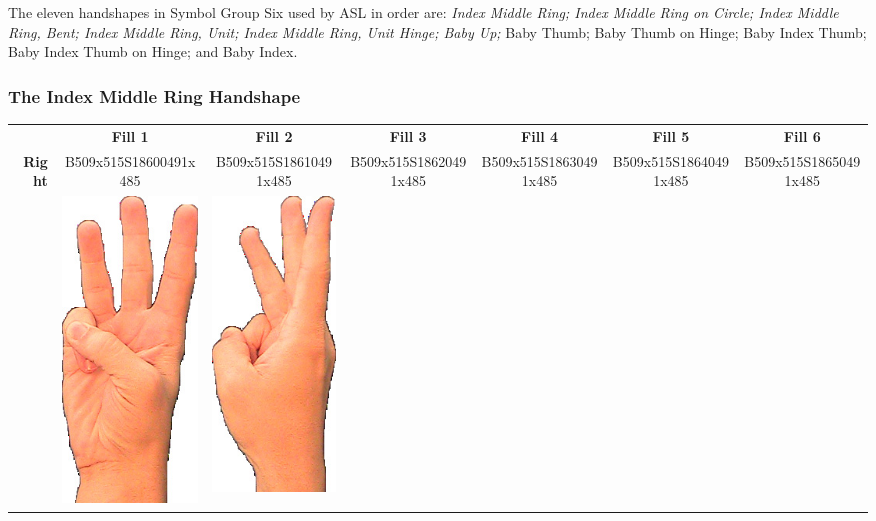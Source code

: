 \documentclass{article}
\begin{document}
The eleven handshapes in Symbol Group Six used by ASL in order are:
{\it
Index Middle Ring;
Index Middle Ring on Circle;
Index Middle Ring, Bent;
Index Middle Ring, Unit;
Index Middle Ring, Unit Hinge;
Baby Up;
}
Baby Thumb;
Baby Thumb on Hinge;
Baby Index Thumb;
Baby Index Thumb on Hinge;
and Baby Index.

\subsubsection{The Index Middle Ring Handshape}

\begin{center}
\begin{tabular}{r*{6}{c}}
&\textbf{Fill 1}&\textbf{Fill 2}&\textbf{Fill 3}&\textbf{Fill 4}&\textbf{Fill 5}&\textbf{Fill 6}\\
\multirow{2}{*}{\textbf{Right}}&
B509x515S18600491x485&
B509x515S18610491x485&
B509x515S18620491x485&
B509x515S18630491x485&
B509x515S18640491x485&
B509x515S18650491x485\\
&
\includegraphics[scale=0.1]{images/06-01-1.jpg}&
\includegraphics[scale=0.1]{images/06-01-2.jpg}&

\end{tabular}
\end{center}
\end{document}
